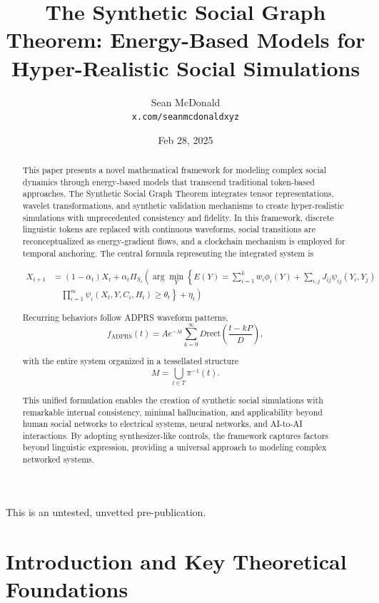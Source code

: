 \documentclass[11pt,a4paper]{article}
\title{The Synthetic Social Graph Theorem: Energy-Based Models for Hyper-Realistic Social Simulations}
\author{Sean McDonald\\
\texttt{x.com/seanmcdonaldxyz}}
\date{Feb 28, 2025}
\begin{document}
\maketitle

\noindent This is an untested, unvetted pre-publication.

\begin{abstract}
This paper presents a novel mathematical framework for modeling complex social dynamics through energy-based models that transcend traditional token-based approaches. The Synthetic Social Graph Theorem integrates tensor representations, wavelet transformations, and synthetic validation mechanisms to create hyper-realistic simulations with unprecedented consistency and fidelity. In this framework, discrete linguistic tokens are replaced with continuous waveforms, social transitions are reconceptualized as energy-gradient flows, and a clockchain mechanism is employed for temporal anchoring. The central formula representing the integrated system is

\begin{align}
X_{t+1} &= (1 - \alpha_t)X_t + \alpha_t \Pi_{S_c}\left(\arg \min_Y \left\{E(Y) = \sum_{i=1}^k w_i \phi_i(Y) + \sum_{i,j} J_{ij} \psi_{ij}(Y_i, Y_j)\right.\right.\nonumber\\
&\quad\left.\left. \prod_{i=1}^m \psi_i(X_t, Y, C_i, H_t) \geq \theta_t\right\} + \eta_t\right)
\end{align}

Recurring behaviors follow ADPRS waveform patterns,
\begin{equation}
f_{\text{ADPRS}}(t) = A e^{-\lambda t} \sum_{k=0}^{\infty} D \text{rect}\left(\frac{t - kP}{D}\right),
\end{equation}

with the entire system organized in a tessellated structure
\begin{equation}
M = \bigcup_{t \in T} \pi^{-1}(t).
\end{equation}

This unified formulation enables the creation of synthetic social simulations with remarkable internal consistency, minimal hallucination, and applicability beyond human social networks to electrical systems, neural networks, and AI-to-AI interactions. By adopting synthesizer-like controls, the framework captures factors beyond linguistic expression, providing a universal approach to modeling complex networked systems.
\end{abstract}

\section{Introduction and Key Theoretical Foundations}
\end{document}
